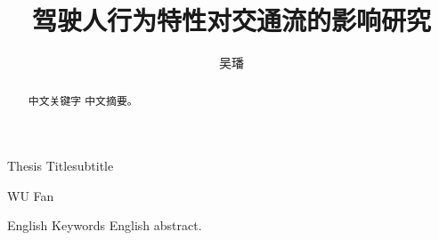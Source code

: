 \documentclass[unicode,master,printedition]{seuthesis} %
\begin{document}
\title{驾驶人行为特性对交通流的影响研究}{}{Thesis Title}{subtitle}
\author{吴\quad{}璠}{WU Fan}
\authorizedate{}
\maketitle

\begin{abstract}{中文关键字}
  中文摘要。
\end{abstract}

\begin{englishabstract}{English Keywords}
  English abstract.
\end{englishabstract}


\begin{Main} %

%







\end{Main} %
\end{document}
